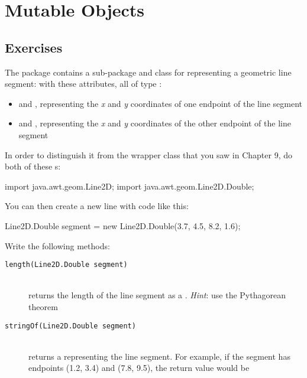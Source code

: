 \chapter{Mutable Objects}

\section{Exercises}

\begin{exercise}
The  package contains a sub-package and class for representing a geometric line segment:  with these attributes, all of type :

\begin{itemize}
\item {} and , representing the {\em x} and {\em y} coordinates of one endpoint of the line segment
\item {} and , representing the {\em x} and {\em y} coordinates of the other endpoint of the line segment
\end{itemize}

In order to distinguish it from the  wrapper class that you saw in Chapter 9, do both of these s:

\begin{code}
import java.awt.geom.Line2D;
import java.awt.geom.Line2D.Double;
\end{code}

You can then create a new line with code like this:

\begin{code}
Line2D.Double segment = new Line2D.Double(3.7, 4.5, 8.2, 1.6);
\end{code}

Write the following methods:

\begin{description}
\item[\texttt{length(Line2D.Double segment)}] \hfill \\ returns the length of the line segment as a . {\em Hint}: use the Pythagorean theorem
\item[\texttt{stringOf(Line2D.Double segment)}] \hfill \\ returns a  representing the line segment. For example, if the segment has endpoints (1.2, 3.4) and (7.8, 9.5), the return value would be 


\end{description}
\end{exercise}
